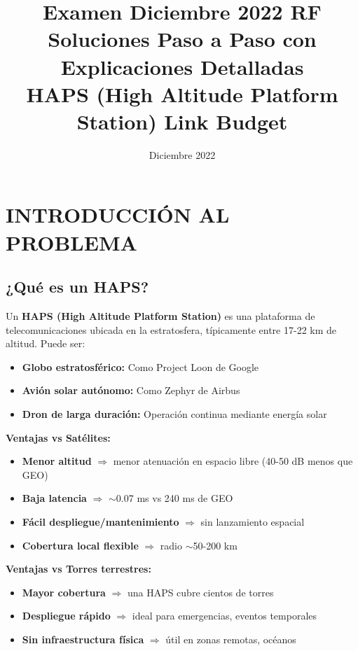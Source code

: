 \documentclass[a4paper,10pt]{article}
\title{\textbf{Examen Diciembre 2022 RF\\Soluciones Paso a Paso con Explicaciones Detalladas\\HAPS (High Altitude Platform Station) Link Budget}}
\author{}
\date{Diciembre 2022}
\begin{document}
\maketitle
\tableofcontents
\newpage

\section{INTRODUCCIÓN AL PROBLEMA}

\subsection{¿Qué es un HAPS?}

Un \textbf{HAPS (High Altitude Platform Station)} es una plataforma de telecomunicaciones ubicada en la estratosfera, típicamente entre 17-22 km de altitud. Puede ser:
\begin{itemize}
    \item \textbf{Globo estratosférico:} Como Project Loon de Google
    \item \textbf{Avión solar autónomo:} Como Zephyr de Airbus
    \item \textbf{Dron de larga duración:} Operación continua mediante energía solar
\end{itemize}

\textbf{Ventajas vs Satélites:}
\begin{itemize}[noitemsep]
    \item \textbf{Menor altitud} $\Rightarrow$ menor atenuación en espacio libre (40-50 dB menos que GEO)
    \item \textbf{Baja latencia} $\Rightarrow$ $\sim$0.07 ms vs 240 ms de GEO
    \item \textbf{Fácil despliegue/mantenimiento} $\Rightarrow$ sin lanzamiento espacial
    \item \textbf{Cobertura local flexible} $\Rightarrow$ radio $\sim$50-200 km
\end{itemize}

\textbf{Ventajas vs Torres terrestres:}
\begin{itemize}[noitemsep]
    \item \textbf{Mayor cobertura} $\Rightarrow$ una HAPS cubre cientos de torres
    \item \textbf{Despliegue rápido} $\Rightarrow$ ideal para emergencias, eventos temporales
    \item \textbf{Sin infraestructura física} $\Rightarrow$ útil en zonas remotas, océanos
\end{itemize}
\end{document}
